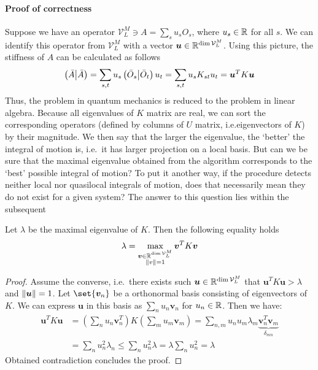 \paragraph{Proof of correctness}
Suppose we have an operator \(\mathcal{V}_L^M \ni A = \sum_s u_s O_s \), where \(u_s \in \mathbb{R} \) for all \(s\).
We can identify this operator from \(\mathcal{V}_L^M\) with a vector \( \bm{u} \in \mathbb{R}^{\dim{\mathcal{V}_L^M}}\). Using this picture,
the stiffness of \(A\) can be calculated as follows
\begin{equation}
  \left(\bar{A} \middle| \bar{A}\right) = \sum_{s,t} u_s \left(\bar{O}_s \middle| \bar{O}_t\right) u_t = \sum_{s,t} u_s K_{st} u_t = 
   \bm{u}^{T} K \bm{u}  
\end{equation} 
Thus, the problem in quantum mechanics is reduced to the problem in linear algebra.
Because all eigenvalues of \(K\) matrix are real, we can sort the corresponding operators
 (defined by columns of \(U\) matrix, i.e.\;eigenvectors of \(K\)) by their magnitude.
We then say that the larger the eigenvalue, the `better' the integral of motion is, i.e.\
it has larger projection on a local basis.
But can we be sure that the maximal eigenvalue obtained from the algorithm corresponds
to the `best' possible integral of motion? To put it another way, if the procedure detects
neither local nor quasilocal integrals of motion, does that necessarily mean they do not exist
for a given system? The answer to this question lies within the subsequent
\begin{proposition}
Let \(\lambda \) be the maximal eigenvalue of \(K\). Then the following equality holds
\begin{equation*}
  \lambda = \max_{  \substack{\bm{v}\in \mathbb{R}^{\dim{\mathcal{V}_L^M}}\\\norm{v} = 1}  }{\bm{v}^{T} K \bm{v}}
\end{equation*}
\end{proposition}
\begin{proof}
  Assume the converse, i.e.\ there exists such \(\bm{u} \in \mathbb{R}^{\dim{\mathcal{V}_L^M}}\) that \(\bm{u}^T K \bm{u} > \lambda\)
  and \(\norm{\bm{u}} = 1\).
  Let \(\set{\bm{v}_n}\) be a orthonormal basis consisting of eigenvectors of \(K\). We can express \(\bm{u}\) in this basis as
  \(\sum_n u_n \bm{v}_n\) for \(u_n \in \mathbb{R}\). Then we have:
  \begin{align*}    
    \bm{u}^T K \bm{u} &= \left( \sum_n u_n \bm{v}_n^{T} \right) K  \left( \sum_m u_m \bm{v}_m \right) 
    = \sum_{n,m} u_n u_m \lambda_m \underbrace{\bm{v}_n^{T} \bm{v}_m}_{\delta_{mn}} \\
    &= \sum_n u_n^2 \lambda_n \leq \sum_n u_n^2 \lambda = \lambda \sum_n u_n^2 = \lambda   
  \end{align*}
  Obtained contradiction concludes the proof.
\end{proof}

